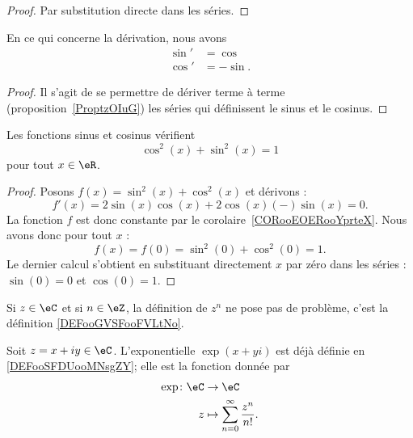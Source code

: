 \begin{proof}
	Par substitution directe dans les séries.
\end{proof}

\begin{lemma}       \label{LEMooBBCAooHLWmno}
	En ce qui concerne la dérivation, nous avons
	\begin{subequations}
		\begin{align}
			\sin' & =\cos   \\
			\cos' & =-\sin.
		\end{align}
	\end{subequations}
\end{lemma}

\begin{proof}
	Il s'agit de se permettre de dériver terme à terme (proposition~\ref{ProptzOIuG}) les séries qui définissent le sinus et le cosinus.
\end{proof}

\begin{lemma}       \label{LEMooAEFPooGSgOkF}
	Les fonctions sinus et cosinus vérifient
	\begin{equation}        \label{EQooNYCZooApyyRd}
		\cos^2(x)+\sin^2(x)=1
	\end{equation}
	pour tout \( x\in \eR\).
\end{lemma}

\begin{proof}
	Posons \( f(x)=\sin^2(x)+\cos^2(x)\) et dérivons :
	\begin{equation}
		f'(x)=2\sin(x)\cos(x)+2\cos(x)(-)\sin(x)=0.
	\end{equation}
	La fonction \( f\) est donc constante par le corolaire~\ref{CORooEOERooYprteX}. Nous avons donc pour tout \( x\) :
	\begin{equation}
		f(x)=f(0)=\sin^2(0)+\cos^2(0)=1.
	\end{equation}
	Le dernier calcul s'obtient en substituant directement \( x\) par zéro dans les séries : \( \sin(0)=0\) et \( \cos(0)=1\).
\end{proof}

Si \( z\in \eC\) et si \( n\in \eZ\), la définition de \( z^n\) ne pose pas de problème, c'est la définition \ref{DEFooGVSFooFVLtNo}.

\begin{normaltext}  \label{DefJilXoM}
	Soit \( z=x+iy\in \eC\). L'exponentielle \( \exp(x+yi)\) est déjà définie en \ref{DEFooSFDUooMNsgZY}; elle est la fonction donnée par
	\begin{equation}
		\begin{aligned}
			\exp\colon \eC & \to \eC                                        \\
			z              & \mapsto \sum_{n=0}^{\infty}\frac{ z^n }{ n! }.
		\end{aligned}
	\end{equation}
\end{normaltext}

